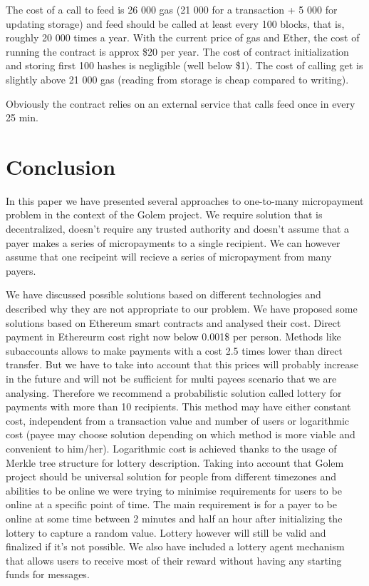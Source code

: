 \documentclass[a4paper]{article}
\begin{document}
    The cost of a call to feed is 26 000 gas (21 000 for a transaction + 5 000 for updating storage) and feed should
    be called at least every 100 blocks, that is, roughly 20 000 times a year. With the current price of gas
    and Ether, the cost of running the contract is approx \$20 per year. The cost of contract initialization and
    storing first 100 hashes is negligible (well below \$1). The cost of calling get is slightly above 21 000 gas
    (reading from storage is cheap compared to writing).

    Obviously the contract relies on an external service that calls feed once in every 25 min.

\section{Conclusion}
    In this paper we have presented several approaches to one-to-many micropayment problem in the context of the Golem
    project. We require solution that is decentralized, doesn't require any trusted authority and doesn't assume that
    a payer makes a series of micropayments to a single recipient. We can however assume that one recipeint will
    recieve a series of micropayment  from many payers.

    We have discussed possible solutions based on different technologies and described why they are not appropriate to
    our problem. We have proposed some solutions based on Ethereum smart contracts and analysed their cost.
    Direct payment in Ethereurm cost right now below 0.001\$ per person. Methods like  subaccounts allows to make
    payments with a cost 2.5 times lower than direct transfer. But we have to take into account that this prices will
    probably increase in the future and will not be sufficient for multi payees scenario that we are analysing.
    Therefore we recommend a probabilistic solution called lottery for payments with more than 10 recipients.
    This method may have either constant cost, independent from a transaction value and number of users or logarithmic
    cost (payee may choose solution depending on which method is more viable and convenient to him/her). Logarithmic
    cost is achieved thanks to the usage of Merkle tree structure for lottery description.
    Taking into account that Golem project should be universal solution for people from different timezones and
    abilities to be online we were trying to minimise requirements for users to be online at a specific point of time.
    The main requirement is for a payer to be online at some time between 2 minutes and half an hour after initializing
    the lottery to capture a random value. Lottery however will still be valid and finalized if it's not possible.
    We also have included a lottery agent mechanism that allows users to receive most of their reward without having
    any starting funds for messages.
\end{document}
